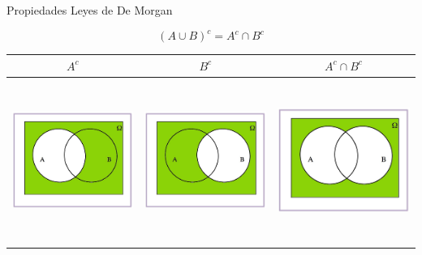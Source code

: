\documentclass[
  ignorenonframetext,
]{beamer}
\begin{document}
\begin{frame}{Propiedades}
\protect\hypertarget{propiedades-5}{}
Leyes de De Morgan

\[(A\cup B)^c=A^c\cap B^c\]

\begin{longtable}[]{@{}ccc@{}}
\toprule
\(A^c\) & \(B^c\) & \(A^c\cap B^c\) \\
\midrule
\endhead
\includegraphics[width=\textwidth,height=2.08333in]{Images/proba1dibujos/demorgan8.jpg}
&
\includegraphics[width=\textwidth,height=2.08333in]{Images/proba1dibujos/demorgan9.jpg}
&
\includegraphics[width=\textwidth,height=2.08333in]{Images/proba1dibujos/demorgan10.jpg} \\
\bottomrule
\end{longtable}
\end{frame}
\end{document}
